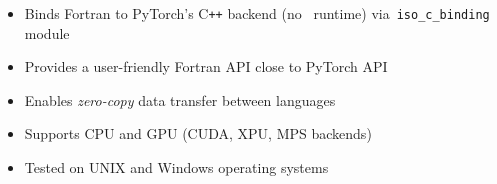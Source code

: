 \begin{itemize}
    \setlength{\itemsep}{0pt}
    \item Binds Fortran to PyTorch's C\texttt{++} backend (no \faPython~runtime) via~\texttt{iso\_c\_binding} module
    \item Provides a user-friendly Fortran API close to PyTorch API
    \item Enables \emph{zero-copy} data transfer between languages
    \item Supports CPU and GPU (CUDA, XPU, MPS backends)
    \item Tested on UNIX and Windows operating systems
\end{itemize}

